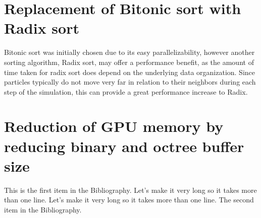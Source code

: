 \documentclass{thesis}
\begin{document}
\section{Replacement of Bitonic sort with Radix sort}
Bitonic sort was initially chosen due to its easy parallelizability, however another sorting algorithm, Radix sort, may offer a performance benefit, as the amount of time taken for radix sort does depend on the underlying data organization. Since particles typically do not move very far in relation to their neighbors during each step of the simulation, this can provide a great performance increase to Radix.
\section{Reduction of GPU memory by reducing binary and octree buffer size}


\begin{singlespace}
\begin{thebibliography}{99}
 This is the first item in the Bibliography.
Let's make it very long so it takes more than one line.
Let's make it very long so it takes more than one line.
 The second item in the Bibliography.
\end{thebibliography}
\end{singlespace}

\appendix    %
\end{document}
